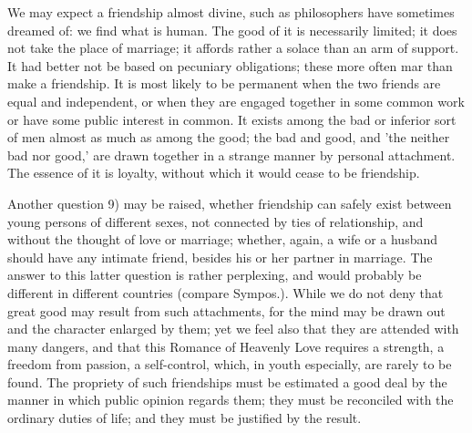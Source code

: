 \documentclass[11pt,letter]{article}
\begin{document}
\par  We may expect a friendship almost divine, such as philosophers have sometimes dreamed of: we find what is human. The good of it is necessarily limited; it does not take the place of marriage; it affords rather a solace than an arm of support. It had better not be based on pecuniary obligations; these more often mar than make a friendship. It is most likely to be permanent when the two friends are equal and independent, or when they are engaged together in some common work or have some public interest in common. It exists among the bad or inferior sort of men almost as much as among the good; the bad and good, and 'the neither bad nor good,' are drawn together in a strange manner by personal attachment. The essence of it is loyalty, without which it would cease to be friendship.

\par  Another question 9) may be raised, whether friendship can safely exist between young persons of different sexes, not connected by ties of relationship, and without the thought of love or marriage; whether, again, a wife or a husband should have any intimate friend, besides his or her partner in marriage. The answer to this latter question is rather perplexing, and would probably be different in different countries (compare Sympos.). While we do not deny that great good may result from such attachments, for the mind may be drawn out and the character enlarged by them; yet we feel also that they are attended with many dangers, and that this Romance of Heavenly Love requires a strength, a freedom from passion, a self-control, which, in youth especially, are rarely to be found. The propriety of such friendships must be estimated a good deal by the manner in which public opinion regards them; they must be reconciled with the ordinary duties of life; and they must be justified by the result.
\end{document}
